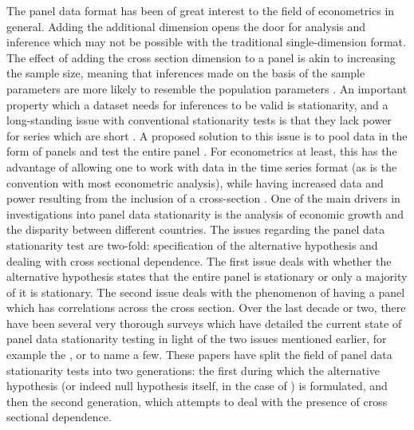 
The panel data format has been of great interest to the field of econometrics in general. Adding the additional dimension opens the door for analysis and inference which may not be possible with the traditional single-dimension format. The effect of adding the cross section dimension to a panel is akin to increasing the sample size, meaning that inferences made on the basis of the sample parameters are more likely to resemble the population parameters \citep{smith}. An important property which a dataset needs for inferences to be valid is stationarity, and a long-standing issue with conventional stationarity tests is that they lack power for series which are short \citep{oh1996purchasing}. A proposed solution to this issue is to pool data in the form of panels and test the entire panel \citep{llc}. For econometrics at least, this has the advantage of allowing one to work with data in the time series format (as is the convention with most econometric analysis), while having increased data and power resulting from the inclusion of a cross-section \citep{baltagi2001nonstationary}. One of the main drivers in investigations into panel data stationarity is the analysis of economic growth and the disparity between different countries. The issues regarding the panel data stationarity test are two-fold: specification of the alternative hypothesis and dealing with cross sectional dependence. The first issue deals with whether the alternative hypothesis states that the entire panel is stationary or only a majority of it is stationary. The second issue deals with the phenomenon of having a panel which has correlations across the cross section. Over the last decade or two, there have been several very thorough surveys which have detailed the current state of panel data stationarity testing in light of the two issues mentioned earlier, for example the \citet{hurlin}, \cite{baltagi2001nonstationary} or \citet{hlouskova} to name a few. These papers have split the field of panel data stationarity tests into two generations: the first during which the alternative hypothesis (or indeed null hypothesis itself, in the case of \citet{hadri2000testing}) is formulated, and then the second generation, which attempts to deal with the presence of cross sectional dependence.

